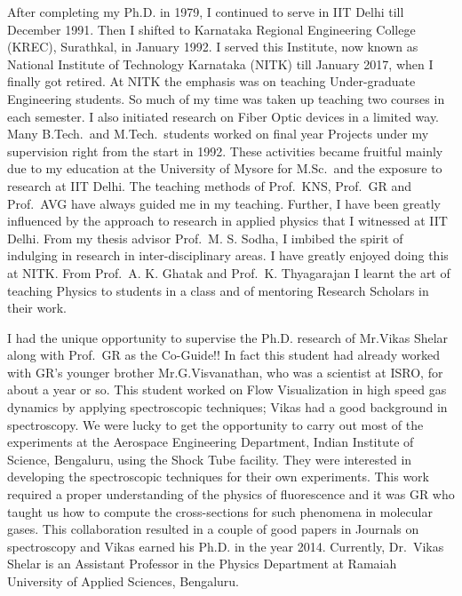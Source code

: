 After completing my Ph.D. in 1979, I continued to serve in IIT Delhi till December 1991. Then I shifted to Karnataka Regional Engineering College (KREC), Surathkal, in January 1992. I served this Institute, now known as National Institute of Technology Karnataka (NITK) till January 2017, when I finally got retired. At NITK the emphasis was on teaching Under-graduate Engineering students. So much of my time was taken up teaching two courses in each semester. I also initiated research on Fiber Optic devices in a limited way. Many B.Tech.\ and M.Tech.\ students worked on final year Projects under my supervision right from the start in 1992. These activities became fruitful mainly due to my education at the University of Mysore for M.Sc.\ and the exposure to research at IIT Delhi. The teaching methods of Prof.\ KNS, Prof.\ GR and Prof.\ AVG have always guided me in my teaching. Further, I have been greatly influenced by the approach to research in applied physics that I witnessed at IIT Delhi. From my thesis advisor Prof.\ M. S. Sodha, I imbibed the spirit of indulging in research in inter-disciplinary areas. I have greatly enjoyed doing this at NITK. From Prof.\ A. K. Ghatak and Prof.\ K. Thyagarajan I learnt the art of teaching Physics to students in a class and of mentoring Research Scholars in their work.  

I had the unique opportunity to supervise the Ph.D. research of Mr.Vikas Shelar along with Prof.\ GR as the Co-Guide!! In fact this student had already worked with GR's younger brother Mr.G.Visvanathan, who was a scientist at ISRO, for about a year or so. This student worked on Flow Visualization in high speed gas dynamics by applying spectroscopic techniques; Vikas had a good background in spectroscopy. We were lucky to get the opportunity to carry out most of the experiments at the Aerospace Engineering Department, Indian Institute of Science, Bengaluru, using the Shock Tube facility. They were interested in developing the spectroscopic techniques for their own experiments. This work required a proper understanding of the physics of fluorescence and it was GR who taught us how to compute the cross-sections for such phenomena in molecular gases. This collaboration resulted in a couple of good papers in Journals on spectroscopy and Vikas earned his Ph.D. in the year 2014. Currently, Dr.\ Vikas Shelar is an Assistant Professor in the Physics Department at Ramaiah University of Applied Sciences, Bengaluru.

